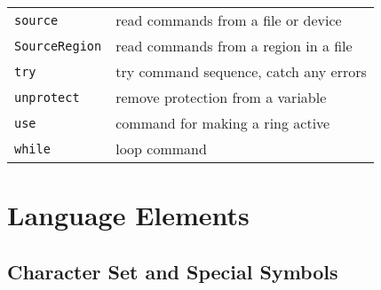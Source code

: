 \documentclass[a4paper]{mybook}
\begin{document}
\begin{center}
\begin{longtable}{ll}
{\verb~source~} &
      read commands from a file or device\\
   
{\verb~SourceRegion~} &
      read commands from a region in a file\\
   
{\verb~try~} &
      try command sequence, catch any errors\\
   
{\verb~unprotect~} &
      remove protection from a variable\\
   
{\verb~use~} &
      command for making a ring active\\
   
{\verb~while~} &
      loop command\\
   
\end{longtable}
\end{center}

\noindent



\chapter{Language Elements}
\label{Language Elements}

      

\section{Character Set and Special Symbols}
\label{Character Set and Special Symbols}
\end{document}
